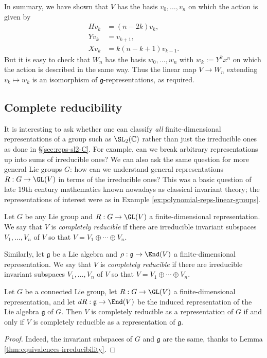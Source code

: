 \documentclass[reqno]{amsart} 
\begin{document}
In summary, we  have shown that $V$ has the basis
$v_0,\dotsc,v_n$
on which the action is given by
\begin{align*}
  H v_k &= (n - 2k ) v_k,
          \\
  Y v_k &= v_{k+1},
          \\
  X v_k &= k(n-k+1) v_{k-1}.
\end{align*}
But it is easy to check that
$W_n$ has the basis $w_0,\dotsc,w_n$
with $w_k := Y^k x^n$
on which  the action is described in the same way.
Thus the linear map $V \rightarrow W_n$
extending $v_k \mapsto w_k$
is an isomorphism of $\mathfrak{g}$-representations,
as required.

\subsection{Complete reducibility\label{sec:compl-red}}
\label{sec:orgf4dbdd0}
It is interesting
to ask whether one can classify
\emph{all} finite-dimensional
representations of a group such as $\SL_2(\mathbb{C})$
rather than just the irreducible ones
as done in
\S\ref{sec:reps-sl2-C}.
For example, can we break arbitrary representations up  into
sums of irreducible ones?
We can also ask the same question
for more general Lie groups $G$:
how can we understand general representations
$R : G \rightarrow \GL(V)$
in terms of the irreducible ones?
This was a basic question of late 19th century mathematics
known nowadays as classical invariant theory;
the representations of interest were as in Example \ref{ex:polynomial-reps-linear-groups}.

\begin{definition}
  Let $G$ be any Lie group
  and $R : G \rightarrow \GL(V)$ a finite-dimensional
  representation.
  We say that $V$ is \emph{completely reducible}
  if there are irreducible invariant subspaces $V_1, \dotsc, V_n$ of $V$
  so that $V = V_1 \oplus \dotsb \oplus V_n$.
\end{definition}
\begin{definition}
  Similarly, let $\mathfrak{g}$ be a Lie algebra
  and $\rho : \mathfrak{g}  \rightarrow \End(V)$ a finite-dimensional
  representation.
  We say that $V$ is \emph{completely reducible}
  if there are irreducible invariant subspaces $V_1, \dotsc, V_n$ of $V$
  so that $V = V_1 \oplus \dotsb \oplus V_n$.
\end{definition}

\begin{lemma}\label{lem:complete-irreducible-gp-vs-alg}
  Let $G$ be a connected Lie group,
  let $R : G \rightarrow \GL(V)$ a finite-dimensional
  representation,
  and let $d R : \mathfrak{g} \rightarrow \End(V)$
  be the induced representation of the Lie algebra
  $\mathfrak{g}$ of $G$.
  Then $V$ is completely reducible
  as a representation of $G$
  if and only if $V$ is completely reducible
  as a representation of $\mathfrak{g}$.
\end{lemma}
\begin{proof}
  Indeed, the invariant subspaces of $G$ and $\mathfrak{g}$
  are the same, thanks to Lemma \ref{thm:equivalences-irreducibility}.
\end{proof}
\end{document}

